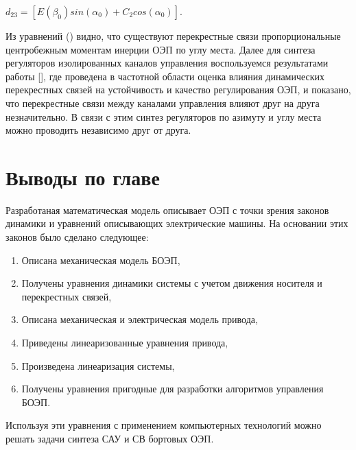 $d_{23} = \left[ E \left( \beta_0 \right) sin \left( \alpha_0 \right) +C_{2}cos \left( \alpha_0 \right) \right]$.

Из уравнений () видно, что существуют перекрестные связи пропорциональные центробежным моментам инерции ОЭП по углу места. Далее для синтеза регуляторов изолированных каналов управления воспользуемся результатами работы [], где проведена в частотной области оценка влияния динамических перекрестных связей на устойчивость и качество регулирования ОЭП, и показано, что перекрестные связи между каналами управления влияют друг на друга незначительно. В связи с этим синтез регуляторов по азимуту и углу места можно проводить независимо друг от друга. 


\section{Выводы по главе} \label{ch:ch3/sect11}

Разработаная математическая модель описывает ОЭП с точки зрения законов динамики и уравнений описывающих электрические машины. На основании этих законов было сделано следующее:
\begin{enumerate}
	\item Описана механическая модель БОЭП,
	\item Получены уравнения динамики системы с учетом движения носителя и перекрестных связей,
	\item Описана механическая и электрическая модель привода,
	\item Приведены линеаризованные уравнения привода,
	\item Произведена линеаризация системы,
	\item Получены уравнения пригодные для разработки алгоритмов управления БОЭП.
\end{enumerate}
Используя эти уравнения с применением компьютерных технологий можно решать задачи синтеза САУ и СВ бортовых ОЭП.

\clearpage